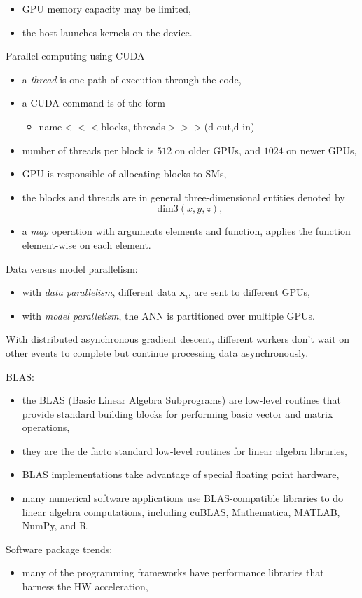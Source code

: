 \documentclass[onecolumn]{IEEEtran}
\newcommand{\beq}{\begin{equation}}
\newcommand{\eeq}{\end{equation}}
\newcommand{\bi}{\begin{itemize}}
\newcommand{\ei}{\end{itemize}}
\begin{document}
\begin{itemize}
        \item GPU memory capacity may be limited,
        \item the host launches kernels on the device.
    \ei
    \item Parallel computing using CUDA
    \bi
        \item a \emph{thread} is one path of execution through the code,
        \item a CUDA command is of the form
        \bi
            \item name$<<<$blocks, threads$>>>$(d-out,d-in)
        \ei
        \item number of threads per block is $512$ on older GPUs, and $1024$ on newer GPUs,
        \item GPU is responsible of allocating blocks to SMs,
        \item the blocks and threads are in general three-dimensional entities denoted by
        \beq
            \text{dim}3(x,y,z),
        \eeq
        \item a \emph{map} operation with arguments elements and function, applies the function element-wise on each element.
    \ei
    \item Data versus model parallelism:
    \bi
        \item with \emph{data parallelism}, different data $\bm{x}_i$, are sent to different GPUs,
        \item with \emph{model parallelism}, the ANN is partitioned over multiple GPUs.
    \ei
    \item With distributed asynchronous gradient descent, different workers don't wait on other events to complete but continue processing data asynchronously.
    \item BLAS:
    \bi
        \item the BLAS (Basic Linear Algebra Subprograms) are low-level routines that provide standard building blocks for performing basic vector and matrix operations,
        \item they are the de facto standard low-level routines for linear algebra libraries,
        \item BLAS implementations take advantage of special floating point hardware,
        \item many numerical software applications use BLAS-compatible libraries to do linear algebra computations, including cuBLAS, Mathematica, MATLAB, NumPy, and R.
    \ei
    \item Software package trends:
    \bi
        \item many of the programming frameworks have performance libraries that harness the HW acceleration,

\end{itemize}
\end{document}
